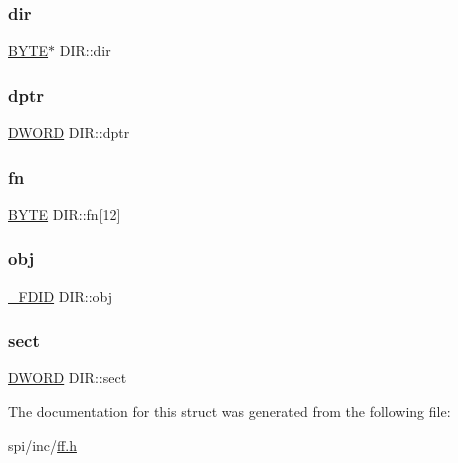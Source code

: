 \mbox{\label{struct_d_i_r_a6c2a8c0cf2d55ae99775e93a16593449}} 
\subsubsection{\texorpdfstring{dir}{dir}}
{\footnotesize\ttfamily \mbox{\hyperlink{lz4_8c_a4ae1dab0fb4b072a66584546209e7d58}{B\+Y\+TE}}$\ast$ D\+I\+R\+::dir}

\mbox{\label{struct_d_i_r_a0330e9554e1f38795debe4495156873e}} 
\subsubsection{\texorpdfstring{dptr}{dptr}}
{\footnotesize\ttfamily \mbox{\hyperlink{integer_8h_ad342ac907eb044443153a22f964bf0af}{D\+W\+O\+RD}} D\+I\+R\+::dptr}

\mbox{\label{struct_d_i_r_ad90d974c0e7640307598c586bf141b32}} 
\subsubsection{\texorpdfstring{fn}{fn}}
{\footnotesize\ttfamily \mbox{\hyperlink{lz4_8c_a4ae1dab0fb4b072a66584546209e7d58}{B\+Y\+TE}} D\+I\+R\+::fn\mbox{[}12\mbox{]}}

\mbox{\label{struct_d_i_r_a5a4848c51616bf4ad90518c211ca3bb3}} 
\subsubsection{\texorpdfstring{obj}{obj}}
{\footnotesize\ttfamily \mbox{\hyperlink{struct___f_d_i_d}{\+\_\+\+F\+D\+ID}} D\+I\+R\+::obj}

\mbox{\label{struct_d_i_r_ad01fcc812ed0dad11a593574336adc9e}} 
\subsubsection{\texorpdfstring{sect}{sect}}
{\footnotesize\ttfamily \mbox{\hyperlink{integer_8h_ad342ac907eb044443153a22f964bf0af}{D\+W\+O\+RD}} D\+I\+R\+::sect}



The documentation for this struct was generated from the following file\+:\begin{DoxyCompactItemize}
\item 
spi/inc/\mbox{\hyperlink{ff_8h}{ff.\+h}}\end{DoxyCompactItemize}
